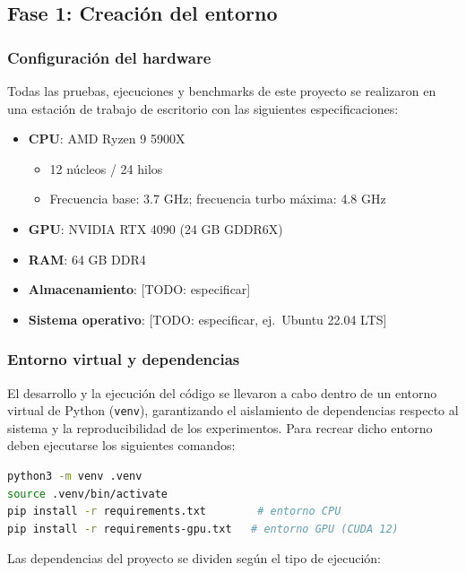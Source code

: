 \subsection{Fase 1: Creación del entorno}

\subsubsection{Configuración del hardware}

Todas las pruebas, ejecuciones y benchmarks de este proyecto se realizaron en una estación de trabajo de escritorio con las siguientes especificaciones:

\begin{itemize}
    \item \textbf{CPU}: AMD Ryzen 9 5900X
    \begin{itemize}
        \item 12 núcleos / 24 hilos
        \item Frecuencia base: 3.7 GHz; frecuencia turbo máxima: 4.8 GHz
    \end{itemize}
    \item \textbf{GPU}: NVIDIA RTX 4090 (24 GB GDDR6X)
    \item \textbf{RAM}: 64 GB DDR4
    \item \textbf{Almacenamiento}: [TODO: especificar]
    \item \textbf{Sistema operativo}: [TODO: especificar, ej.\ Ubuntu 22.04 LTS]
\end{itemize}

\subsubsection{Entorno virtual y dependencias}

El desarrollo y la ejecución del código se llevaron a cabo dentro de un entorno virtual de Python (\texttt{venv}), garantizando el aislamiento de dependencias respecto al sistema y la reproducibilidad de los experimentos. Para recrear dicho entorno deben ejecutarse los siguientes comandos:

\begin{lstlisting}[language=bash]
python3 -m venv .venv
source .venv/bin/activate
pip install -r requirements.txt        # entorno CPU
pip install -r requirements-gpu.txt   # entorno GPU (CUDA 12)
\end{lstlisting}

Las dependencias del proyecto se dividen según el tipo de ejecución:

